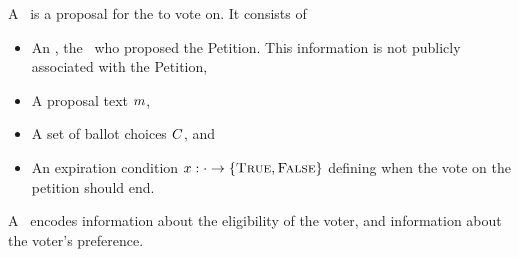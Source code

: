   A \StructPetition~is a proposal for the \KwCluster to vote on. It consists of
    \begin{itemize}
      \item An \StructInstigator, the \KwPeer~who proposed the
        Petition. This information is not publicly associated with
        the Petition,
      \item A proposal text $m$,
      \item A set of ballot choices $C$, and
      \item An expiration condition $x : \cdot \to \{\textsc{True},
        \textsc{False}\}$ defining when the vote on the petition should end.
   \end{itemize}

  A \StructBallot~encodes information about the eligibility of the voter,
    and information about the voter's preference.


